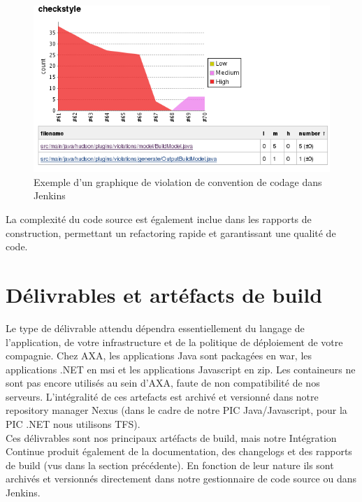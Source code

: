     \begin{figure}
      \begin{center}
        \includegraphics[scale=0.7]{images/JenkinsCodingReport.png}
      \end{center}
      \caption{Exemple d'un graphique de violation de convention de codage dans Jenkins}
      \label{JenkinsTestReport}
    \end{figure}

    La complexité du code source est également inclue dans les rapports de construction, permettant un refactoring rapide et garantissant une qualité de code.

  \section{Délivrables et artéfacts de build}
  Le type de délivrable attendu dépendra essentiellement du langage de l'application, de votre infrastructure et de la politique de déploiement de votre compagnie. Chez AXA, les applications Java sont packagées en war, les applications .NET en msi et les applications Javascript en zip. Les containeurs ne sont pas encore utilisés au sein d'AXA, faute de non compatibilité de nos serveurs. L'intégralité de ces artefacts est archivé et versionné dans notre repository manager \gls{Nexus} (dans le cadre de notre PIC Java/Javascript, pour la PIC .NET nous utilisons TFS).\\

  Ces délivrables sont nos principaux artéfacts de build, mais notre Intégration Continue produit également de la documentation, des changelogs et des rapports de build (vus dans la section précédente). En fonction de leur nature ils sont archivés et versionnés directement dans notre gestionnaire de code source ou dans Jenkins.\\

